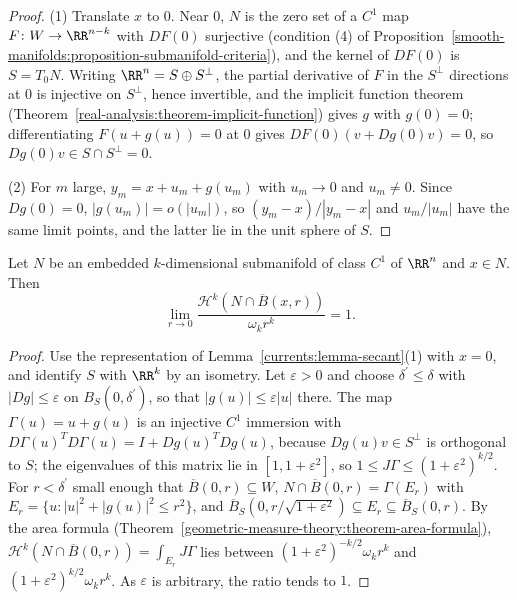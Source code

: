 \begin{proof}
(1) Translate $x$ to $0$. Near $0$, $N$ is the zero set of a $C^1$ map $F \colon W \to \RR^{n-k}$ with $DF(0)$ surjective (condition (4) of
Proposition~\ref{smooth-manifolds:proposition-submanifold-criteria}), and the kernel of $DF(0)$ is $S = T_0N$.
Writing $\RR^n = S \oplus S^\perp$, the partial derivative of $F$ in the $S^\perp$ directions at $0$ is injective on $S^\perp$, hence invertible, and the implicit function theorem
(Theorem~\ref{real-analysis:theorem-implicit-function}) gives $g$ with $g(0) = 0$; differentiating $F(u + g(u)) = 0$ at $0$ gives $DF(0)(v + Dg(0)v) = 0$, so $Dg(0)v \in S \cap S^\perp = 0$.

(2) For $m$ large, $y_m = x + u_m + g(u_m)$ with $u_m \to 0$ and $u_m \neq 0$. Since $Dg(0) = 0$, $|g(u_m)| = o(|u_m|)$, so $(y_m - x)/|y_m - x|$ and $u_m/|u_m|$ have the same limit points, and the latter lie in
the unit sphere of $S$.
\end{proof}

\begin{lemma}\label{currents:lemma-submanifold-density}
Let $N$ be an embedded $k$-dimensional submanifold of class $C^1$ of $\RR^n$ and $x \in N$. Then
\[
\lim_{r \to 0}\frac{\mathcal{H}^k(N \cap \overline{B}(x, r))}{\omega_kr^k} = 1 .
\]
\end{lemma}

\begin{proof}
Use the representation of Lemma~\ref{currents:lemma-secant}(1) with $x = 0$, and identify $S$ with $\RR^k$ by an isometry. Let $\varepsilon > 0$ and choose $\delta^{\prime} \leq \delta$ with $|Dg| \leq \varepsilon$ on
$B_S(0, \delta^{\prime})$, so that $|g(u)| \leq \varepsilon|u|$ there. The map $\Gamma(u) = u + g(u)$ is an injective $C^1$ immersion with $D\Gamma(u)^TD\Gamma(u) = I + Dg(u)^TDg(u)$, because $Dg(u)v \in S^\perp$ is
orthogonal to $S$; the eigenvalues of this matrix lie in $[1, 1 + \varepsilon^2]$, so $1 \leq J\Gamma \leq (1 + \varepsilon^2)^{k/2}$. For $r < \delta^{\prime}$ small enough that $\overline{B}(0, r) \subseteq W$,
$N \cap \overline{B}(0, r) = \Gamma(E_r)$ with $E_r = \{u : |u|^2 + |g(u)|^2 \leq r^2\}$, and $\overline{B}_S(0, r/\sqrt{1 + \varepsilon^2}) \subseteq E_r \subseteq \overline{B}_S(0, r)$. By the area formula
(Theorem~\ref{geometric-measure-theory:theorem-area-formula}), $\mathcal{H}^k(N \cap \overline{B}(0, r)) = \int_{E_r}J\Gamma$ lies between $(1 + \varepsilon^2)^{-k/2}\omega_kr^k$ and
$(1 + \varepsilon^2)^{k/2}\omega_kr^k$. As $\varepsilon$ is arbitrary, the ratio tends to $1$.
\end{proof}

